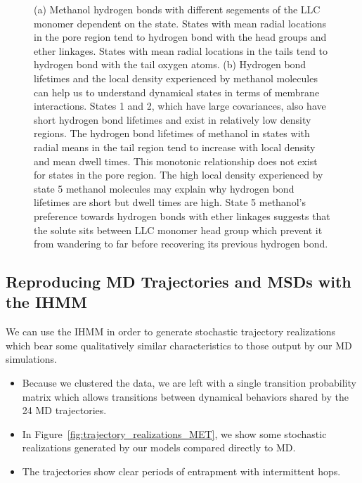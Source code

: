 \documentclass{article}
\begin{document}
\begin{figure}
  \caption{(a) Methanol hydrogen bonds with different segements of the LLC monomer
  dependent on the state. States with mean radial locations in the pore region tend to
  hydrogen bond with the head groups and ether linkages. States with mean radial
  locations in the tails tend to hydrogen bond with the tail oxygen atoms.
  (b) Hydrogen bond lifetimes and the local density experienced by methanol
  molecules can help us to understand dynamical states in terms of membrane 
  interactions. States 1 and 2, which have large covariances, also have short
  hydrogen bond lifetimes and exist in relatively low density regions. The
  hydrogen bond lifetimes of methanol in states with radial means in the tail
  region tend to increase with local density and mean dwell times. This monotonic
  relationship does not exist for states in the pore region. The high 
  local density experienced by state 5 methanol molecules may explain why 
  hydrogen bond lifetimes are short but dwell times are high. State 5 methanol's
  preference towards hydrogen bonds with ether linkages suggests that the solute
  sits between LLC monomer head group which prevent it from wandering to far
  before recovering its previous hydrogen bond.
  }\label{fig:hbond_pichart}
  \end{figure}
  

  \subsection{Reproducing MD Trajectories and MSDs with the IHMM}
  
  We can use the IHMM in order to generate stochastic trajectory realizations
  which bear some qualitatively similar characteristics to those output
  by our MD simulations.
  \begin{itemize}
    \item Because we clustered the data, we are left with a single transition
    probability matrix which allows transitions between dynamical behaviors
    shared by the 24 MD trajectories.
    \item In Figure~\ref{fig:trajectory_realizations_MET}, we show some stochastic
    realizations generated by our models compared directly to MD.
    \item The trajectories show clear periods of entrapment with intermittent hops.
  \end{itemize}
  
\end{document}
